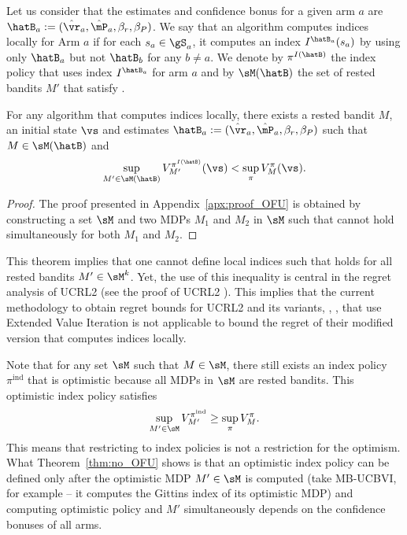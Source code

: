 Let us consider that the estimates and confidence bonus for a given arm $a$ are $\hatB_a:=(\hat{\vr}_a,\hat{\mP}_a,\beta_{r},\beta_{P})$. We say that an algorithm computes indices locally for Arm $a$ if for each $s_a\in\gS_a$, it computes an index $I^{\hatB_a}(s_a)$ by using only $\hatB_a$ but not $\hatB_{b}$ for any $b\ne a$. We denote by $\pi^{I(\hatB)}$ the index policy that uses index $I^{\hatB_a}$ for arm $a$ and by $\sM(\hatB)$ the set of rested bandits $M'$ that satisfy .
\begin{thm}
    \label{thm:no_OFU}
    For any algorithm that computes indices locally, there exists a rested bandit $M$, an initial state $\vs$ and estimates $\hatB_a:=(\hat{\vr}_a,\hat{\mP}_a, \beta_r, \beta_P)$ such that $M\in\sM(\hatB)$ and
    \begin{align*}
        \sup_{M'\in\sM(\hatB)}V^{\pi^{I(\hatB)}}_{M'}(\vs) < \sup_\pi V^{\pi}_{M}(\vs).
    \end{align*}
\end{thm}
\begin{proof}
    The proof presented in Appendix~\ref{apx:proof_OFU} is obtained by constructing a set $\sM$ and two MDPs $M_1$ and $M_2$ in $\sM$ such that  cannot hold simultaneously for both $M_1$ and $M_2$. 
\end{proof}
This theorem implies that one cannot define local indices such that  holds for all rested bandits $M'\in\sM^k$. Yet, the use of this inequality is central in the regret analysis of UCRL2 (see the proof of UCRL2 \cite{jaksch2010near}). This implies that the current methodology to obtain regret bounds for UCRL2 and its variants, \eg, \cite{bourel2020tightening,fruit2018efficient,talebi2018variance,filippi2010optimism}, that use Extended Value Iteration is not applicable to bound the regret of their modified version that computes indices locally. 

Note that for any set $\sM$ such that $M \in \sM$, there still exists an index policy $\pi^{\mathrm{ind}}$ that is optimistic because all MDPs in $\sM$ are rested bandits. This optimistic index policy satisfies
\begin{align*}
  \sup_{M'\in\sM}V^{\pi^{\mathrm{ind}}}_{M'} \ge \sup_\pi V^{\pi}_{M}.
\end{align*}
This means that restricting to index policies is not a restriction for the optimism. What Theorem~\ref{thm:no_OFU} shows is that an optimistic index policy can be defined only after the optimistic MDP $M'\in\sM$ is computed (take MB-UCBVI, for example -- it computes the Gittins index of its optimistic MDP) and computing optimistic policy and $M'$ simultaneously depends on the confidence bonuses of all arms.

